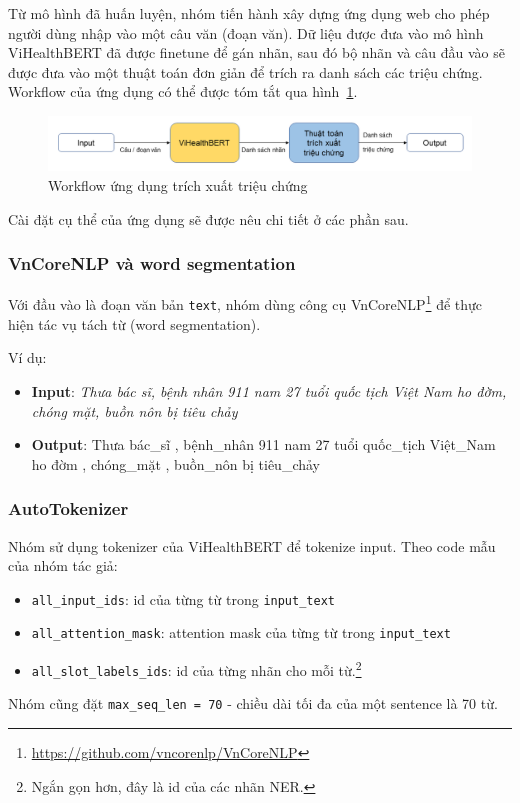 Từ mô hình đã huấn luyện, nhóm tiến hành xây dựng ứng dụng web cho phép người dùng nhập vào một câu văn (đoạn văn). Dữ liệu được đưa vào mô hình ViHealthBERT đã được finetune để gán nhãn, sau đó bộ nhãn và câu đầu vào sẽ được đưa vào một thuật toán đơn giản để trích ra danh sách các triệu chứng. Workflow của ứng dụng có thể được tóm tắt qua hình~\ref{fig:workflow}.
\begin{figure}
\centering
\includegraphics[scale=.6]{img/workflow.png}
\caption{Workflow ứng dụng trích xuất triệu chứng}
\label{fig:workflow}
\end{figure}
Cài đặt cụ thể của ứng dụng sẽ được nêu chi tiết ở các phần sau.

\subsubsection{VnCoreNLP và word segmentation}
 Với đầu vào là đoạn văn bản \texttt{text}, nhóm dùng công cụ VnCoreNLP\footnote{\href{https://github.com/vncorenlp/VnCoreNLP}{https://github.com/vncorenlp/VnCoreNLP}} để thực hiện tác vụ tách từ (word segmentation).

\lstset{style=mystyle}

Ví dụ:
\begin{itemize}
\item \textbf{Input}: 
\textit{Thưa bác sĩ, bệnh nhân 911 nam 27 tuổi quốc tịch Việt Nam ho đờm, chóng mặt, buồn nôn bị tiêu chảy}
\item \textbf{Output}: Thưa bác\_sĩ , bệnh\_nhân 911 nam 27 tuổi quốc\_tịch Việt\_Nam ho đờm , chóng\_mặt , buồn\_nôn bị tiêu\_chảy
\end{itemize}

\subsubsection{AutoTokenizer}
Nhóm sử dụng tokenizer của ViHealthBERT để tokenize input. Theo code mẫu của nhóm tác giả:
\begin{itemize}
    \item \texttt{all\_input\_ids}: id của từng từ trong \texttt{input\_text}
    \item \texttt{all\_attention\_mask}: attention mask của từng từ trong \texttt{input\_text}
    \item \texttt{all\_slot\_labels\_ids}: id của từng nhãn cho mỗi từ.\footnote{Ngắn gọn hơn, đây là id của các nhãn NER.}
\end{itemize} 
Nhóm cũng đặt \texttt{max\_seq\_len = 70} - chiều dài tối đa của một sentence là 70 từ.
\lstset{style=mystyle}


